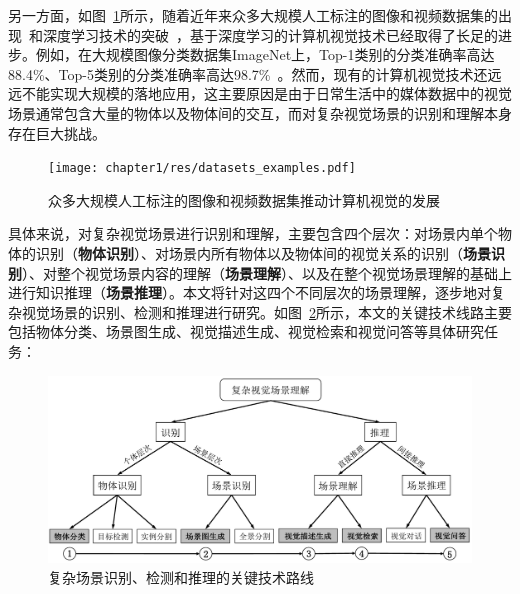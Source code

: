 另一方面，如图~\ref{ch1:fig:datasets_examples}所示，随着近年来众多大规模人工标注的图像和视频数据集的出现~\cite{lin2014microsoft,russakovsky2015imagenet,krishna2017visual,karpathy2014large,miech2019howto100m}和深度学习技术的突破~\cite{lecun2015deep,krizhevsky2012imagenet}，基于深度学习的计算机视觉技术已经取得了长足的进步。例如，在大规模图像分类数据集ImageNet上，Top-1类别的分类准确率高达88.4\%、Top-5类别的分类准确率高达98.7\%~\cite{xie2019self}。然而，现有的计算机视觉技术还远远不能实现大规模的落地应用，这主要原因是由于日常生活中的媒体数据中的视觉场景通常包含大量的物体以及物体间的交互，而对复杂视觉场景的识别和理解本身存在巨大挑战。

\begin{figure}[t]
    \centering
        \texttt{[image: chapter1/res/datasets\_examples.pdf]}
    \caption{众多大规模人工标注的图像和视频数据集推动计算机视觉的发展}
    \label{ch1:fig:datasets_examples}
\end{figure}

具体来说，对复杂视觉场景进行识别和理解，主要包含四个层次：对场景内单个物体的识别（\textbf{物体识别}）、对场景内所有物体以及物体间的视觉关系的识别（\textbf{场景识别}）、对整个视觉场景内容的理解（\textbf{场景理解}）、以及在整个视觉场景理解的基础上进行知识推理（\textbf{场景推理}）。本文将针对这四个不同层次的场景理解，逐步地对复杂视觉场景的识别、检测和推理进行研究。如图~\ref{ch1:fig:scene_understanding}所示，本文的关键技术线路主要包括物体分类、场景图生成、视觉描述生成、视觉检索和视觉问答等具体研究任务：

\begin{figure}[t]
    \centering
        \includegraphics[width=0.95\linewidth]{chapter1/res/scene_understanding.pdf}
    \centering
    \caption{复杂场景识别、检测和推理的关键技术路线}
    \label{ch1:fig:scene_understanding}
\end{figure}

